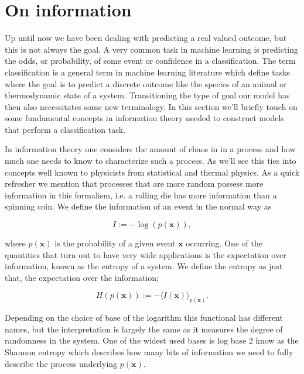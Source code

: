 
\section{On information}\label{sec:information}

Up until now we have been dealing with predicting a real valued outcome, but this is not always the goal. A very common task in machine learning is predicting the odds, or probability, of some event or confidence in a classification. The term classification is a general term in machine learning literature which define tasks where the goal is to predict a discrete outcome like the species of an animal or thermodynamic state of a system. Transitioning the type of goal our model has then also necessitates some new terminology. In this section we'll briefly touch on some fundamental concepts in information theory needed to construct models that perform a classification task.

In information theory one considers the amount of chaos in in a process and how much one needs to know to characterize such a process. As we'll see this ties into concepts well known to physicists from statistical and thermal physics. As a quick refresher we mention that processes that are more random possess more information in this formalism, i.e. a rolling die has more information than a spinning coin. We define the information of an event in the normal way as 

\begin{equation}
I := -\log(p(\mathbf{x})),
\end{equation} 

\noindent where $p(\mathbf{x})$ is the probability of a given event $\mathbf{x}$ occurring. One of the quantities that turn out to have very wide applications is the expectation over information, known as the entropy of a system. We define the entropy as just that, the expectation over the information;

\begin{equation}
H(p(\mathbf{x})):= -\langle I(\mathbf{x}) \rangle_{p(\mathbf{x})}.
\end{equation}

\noindent Depending on the choice of base of the logarithm this functional has different names, but the interpretation is largely the same as it measures the degree of randomness in the system. One of the widest used bases is log base 2 know as the Shannon entropy which describes how many bits of information we need to fully describe the process underlying $p(\mathbf{x})$. 

